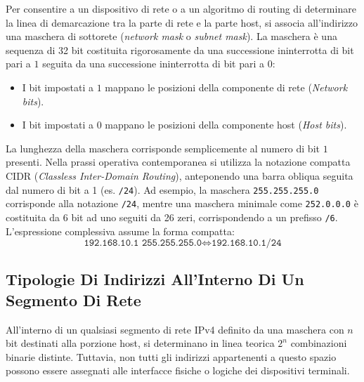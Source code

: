 \documentclass[11pt, a4paper]{article}
\begin{document}

Per consentire a un dispositivo di rete o a un algoritmo di routing di determinare la linea di demarcazione tra la parte di rete e la parte host, si associa all'indirizzo una maschera di sottorete (\emph{network mask} o \emph{subnet mask}). La maschera è una sequenza di 32 bit costituita rigorosamente da una successione ininterrotta di bit pari a $1$ seguita da una successione ininterrotta di bit pari a $0$:
\begin{itemize}
    \item I bit impostati a $1$ mappano le posizioni della componente di rete (\emph{Network bits}).
    \item I bit impostati a $0$ mappano le posizioni della componente host (\emph{Host bits}).
\end{itemize}
La lunghezza della maschera corrisponde semplicemente al numero di bit $1$ presenti. Nella prassi operativa contemporanea si utilizza la notazione compatta CIDR (\emph{Classless Inter-Domain Routing}), anteponendo una barra obliqua seguita dal numero di bit a 1 (es. \texttt{/24}). Ad esempio, la maschera \texttt{255.255.255.0} corrisponde alla notazione \texttt{/24}, mentre una maschera minimale come \texttt{252.0.0.0} è costituita da 6 bit ad uno seguiti da 26 zeri, corrispondendo a un prefisso \texttt{/6}. L'espressione complessiva assume la forma compatta:
\[
\texttt{192.168.10.1 255.255.255.0} \iff \texttt{192.168.10.1/24}
\]

\subsection{Tipologie Di Indirizzi All'Interno Di Un Segmento Di Rete}
All'interno di un qualsiasi segmento di rete IPv4 definito da una maschera con $n$ bit destinati alla porzione host, si determinano in linea teorica $2^n$ combinazioni binarie distinte. Tuttavia, non tutti gli indirizzi appartenenti a questo spazio possono essere assegnati alle interfacce fisiche o logiche dei dispositivi terminali.

\end{document}
